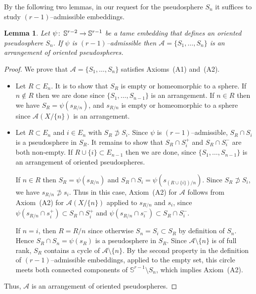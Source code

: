 \documentclass[a4paper]{amsart}
\def\co{\colon\thinspace}
\newcommand{\p}{\mathbb S}
\newtheorem{lemma}{Lemma}
\theoremstyle{definition}
\theoremstyle{remark}
\begin{document}
By the following two lemmas, in our request for the pseudosphere $S_n$ it
suffices to study $(r-1)$--admissible embeddings.
\begin{lemma}\label{lem:admissibelarrangement}
  Let $\psi\co\p^{r-2}\to\p^{r-1}$ be a tame embedding that defines an
  oriented pseudosphere $S_n$. If $\psi$ is $(r-1)$--admissible
  then $\mathcal A= \{S_1,\dots,S_n\}$ is an arrangement of oriented
  pseudospheres.
\end{lemma}
\begin{proof}
  We prove that $\mathcal A = \{S_1,\dots,S_n\}$ satisfies
  Axioms~(A1) and~(A2).
  \begin{itemize}
  \item[(A1)] Let $R\subset E_n$. It is to show that $S_R$ is empty or
    homeomorphic  to a sphere. If $n\not\in R$ then we are done since
    $\{S_1,\dots, S_{n-1}\}$ is an arrangement. 
    If $n\in R$ then we have $S_R=\psi(s_{R/n})$, and $s_{R/n}$ is empty 
    or homeomorphic to a
    sphere since $\mathcal A(X/\{n\})$ is an arrangement. 
  \item[(A2)] Let $R\subset E_n$ and $i\in E_n$ with $S_R\not\supset
    S_i$. Since $\psi$ is $(r-1)$--admissible, $S_R\cap S_i$ is a
    pseudosphere in $S_R$.  It remains to show that $S_R\cap S_i^+$ and
    $S_R\cap S_i^-$ are both non-empty.  If $R\cup \{i\}\subset E_{n-1}$
    then we are done, since $\{S_1,\dots, S_{n-1}\}$ is an arrangement
    of oriented pseudospheres.

    If $n\in R$ then $S_R= \psi(s_{R/n})$ and $S_R\cap S_i =
    \psi(s_{(R\cup \{i\})/n})$. Since $S_R\not\supset S_i$, we have
    $s_{R/n}\not\supset s_i$. Thus in this case, Axiom~(A2) for
    $\mathcal A$ follows from Axiom~(A2) for $\mathcal A(X/\{n\})$
    applied to $s_{R/n}$ and $s_i$, since
    $\psi(s_{R/n}\cap s_i^+) \subset S_R\cap S_i^+$ and  
    $\psi(s_{R/n}\cap s_i^-) \subset S_R\cap S_i^-$.

    If $n=i$, then $R=R/n$ since otherwise $S_n=S_i\subset S_R$ by
    definition of $S_n$.  Hence  $S_R\cap S_n = \psi(s_{R})$ is a
    pseudosphere in $S_R$. Since $\mathcal A\setminus \{n\}$ is of full
    rank, $S_R$ contains a cycle of $\mathcal A\setminus \{n\}$. By the
    second property in the definition of $(r-1)$--admissible embeddings,
    applied to the empty set, 
    this circle meets both  connected components of $\p^{r-1}\setminus
    S_n$, which implies Axiom~(A2). 
  \end{itemize}
  Thus, $\mathcal A$ is an arrangement of oriented
  pseudospheres. 
\end{proof}
\end{document}
